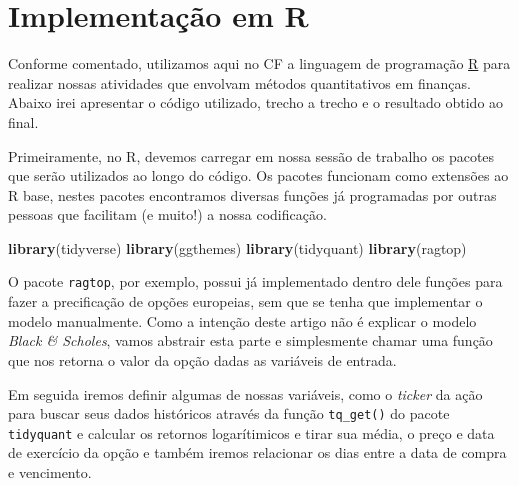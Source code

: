 \documentclass[]{book}
\newenvironment{Shaded}{\begin{snugshade}}{\end{snugshade}}
\newcommand{\KeywordTok}[1]{\textcolor[rgb]{0.13,0.29,0.53}{\textbf{#1}}}
\newcommand{\NormalTok}[1]{#1}
\theoremstyle{definition}
\theoremstyle{definition}
\theoremstyle{definition}
\theoremstyle{remark}
\begin{document}
\section{Implementação em R}\label{implementacao-em-r}

Conforme comentado, utilizamos aqui no CF a linguagem de programação
\href{https://cran.r-project.org/}{R} para realizar nossas atividades
que envolvam métodos quantitativos em finanças. Abaixo irei apresentar o
código utilizado, trecho a trecho e o resultado obtido ao final.

Primeiramente, no R, devemos carregar em nossa sessão de trabalho os
pacotes que serão utilizados ao longo do código. Os pacotes funcionam
como extensões ao R base, nestes pacotes encontramos diversas funções já
programadas por outras pessoas que facilitam (e muito!) a nossa
codificação.

\begin{Shaded}
\begin{Highlighting}[]
\KeywordTok{library}\NormalTok{(tidyverse)}
\KeywordTok{library}\NormalTok{(ggthemes)}
\KeywordTok{library}\NormalTok{(tidyquant)}
\KeywordTok{library}\NormalTok{(ragtop)}
\end{Highlighting}
\end{Shaded}

O pacote \texttt{ragtop}, por exemplo, possui já implementado dentro
dele funções para fazer a precificação de opções europeias, sem que se
tenha que implementar o modelo manualmente. Como a intenção deste artigo
não é explicar o modelo \emph{Black \& Scholes}, vamos abstrair esta
parte e simplesmente chamar uma função que nos retorna o valor da opção
dadas as variáveis de entrada.

Em seguida iremos definir algumas de nossas variáveis, como o
\emph{ticker} da ação para buscar seus dados históricos através da
função \texttt{tq\_get()} do pacote \texttt{tidyquant} e calcular os
retornos logarítimicos e tirar sua média, o preço e data de exercício da
opção e também iremos relacionar os dias entre a data de compra e
vencimento.
\end{document}
